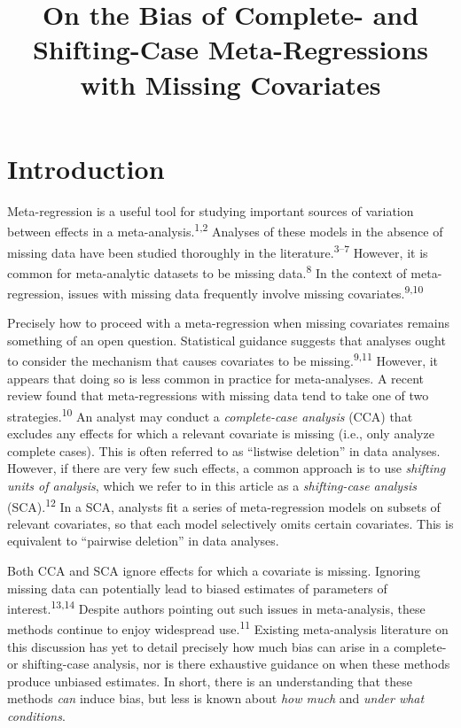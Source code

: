 \documentclass[
]{article}
\title{On the Bias of Complete- and Shifting-Case Meta-Regressions with Missing Covariates}
\author{}
\date{\vspace{-2.5em}}
\begin{document}
\maketitle

\hypertarget{introduction}{%
\section{Introduction}\label{introduction}}

Meta-regression is a useful tool for studying important sources of variation between effects in a meta-analysis.\textsuperscript{1,2}
Analyses of these models in the absence of missing data have been studied thoroughly in the literature.\textsuperscript{3--7}
However, it is common for meta-analytic datasets to be missing data.\textsuperscript{8}
In the context of meta-regression, issues with missing data frequently involve missing covariates.\textsuperscript{9,10}

Precisely how to proceed with a meta-regression when missing covariates remains something of an open question.
Statistical guidance suggests that analyses ought to consider the mechanism that causes covariates to be missing.\textsuperscript{9,11}
However, it appears that doing so is less common in practice for meta-analyses.
A recent review found that meta-regressions with missing data tend to take one of two strategies.\textsuperscript{10}
An analyst may conduct a \emph{complete-case analysis} (CCA) that excludes any effects for which a relevant covariate is missing (i.e., only analyze complete cases).
This is often referred to as ``listwise deletion'' in data analyses.
However, if there are very few such effects, a common approach is to use \emph{shifting units of analysis}, which we refer to in this article as a \emph{shifting-case analysis} (SCA).\textsuperscript{12}
In a SCA, analysts fit a series of meta-regression models on subsets of relevant covariates, so that each model selectively omits certain covariates.
This is equivalent to ``pairwise deletion'' in data analyses.

Both CCA and SCA ignore effects for which a covariate is missing.
Ignoring missing data can potentially lead to biased estimates of parameters of interest.\textsuperscript{13,14}
Despite authors pointing out such issues in meta-analysis, these methods continue to enjoy widespread use.\textsuperscript{11}
Existing meta-analysis literature on this discussion has yet to detail precisely how much bias can arise in a complete- or shifting-case analysis, nor is there exhaustive guidance on when these methods produce unbiased estimates.
In short, there is an understanding that these methods \emph{can} induce bias, but less is known about \emph{how much} and \emph{under what conditions}.
\end{document}
